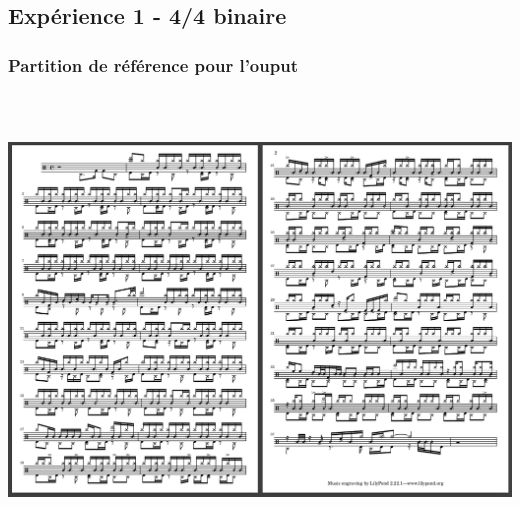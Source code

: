 \subsection{Expérience 1 - 4/4 binaire}
\subsubsection{Partition de référence pour l’ouput}
\includegraphics[height=120mm, width=160mm]{z_images/4_experimentations/experience_1/partition.png}
